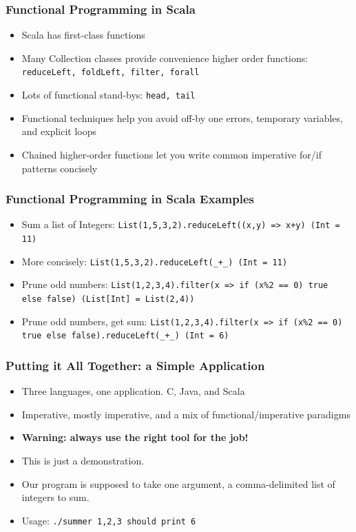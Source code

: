 \documentclass[hyperref={colorlinks=true}]{beamer}
\begin{document}
\begin{frame} 
\frametitle{Functional Programming in Scala}
\begin{itemize}
  \item<1-> Scala has first-class functions
  \item<2-> Many Collection classes provide convenience higher order functions: \tt\small{reduceLeft, foldLeft, filter, forall}
  \item<3-> Lots of functional stand-bys: \tt\small{head, tail}
  \item<4-> Functional techniques help you avoid off-by one errors, temporary variables, and explicit loops
  \item<5-> Chained higher-order functions let you write common imperative for/if patterns concisely
\end{itemize}
\end{frame} 

\begin{frame} 
\frametitle{Functional Programming in Scala Examples}
\begin{itemize}
  \item<1-> Sum a list of Integers: \tt{List(1,5,3,2).reduceLeft((x,y) => x+y) (Int = 11)}
  \item<2-> More concisely: \tt{List(1,5,3,2).reduceLeft(\_+\_) (Int = 11)}
  \item<3-> Prune odd numbers: \tt{List(1,2,3,4).filter(x => if (x\%2 == 0) true else false) (List[Int] = List(2,4))}
  \item<4-> Prune odd numbers, get sum: \tt{List(1,2,3,4).filter(x => if (x\%2 == 0) true else false).reduceLeft(\_+\_) (Int = 6)}
\end{itemize}
\end{frame} 

\begin{frame} 
\frametitle{Putting it All Together: a Simple Application}
\begin{itemize}
  \item<1-> Three languages, one application. C, Java, and Scala
  \item<2-> Imperative, mostly imperative, and a mix of functional/imperative paradigms
  \item<3-> \textbf{Warning: always use the right tool for the job!}
  \item<4-> This is just a demonstration.
  \item<5-> Our program is supposed to take one argument, a comma-delimited list of integers to sum.
  \item<6-> Usage: \tt{./summer 1,2,3} should print 6
\end{itemize}
\end{frame} 
\end{document}
